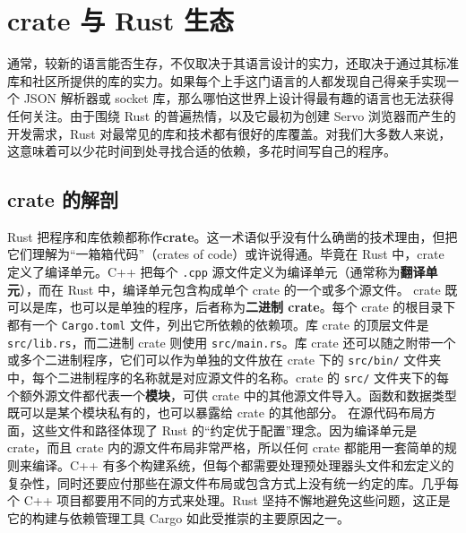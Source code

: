 \section{crate 与 Rust 生态}
\label{idx:idx_a44cb325}
通常，较新的语言能否生存，不仅取决于其语言设计的实力，还取决于通过其标准库和社区所提供的库的实力。如果每个上手这门语言的人都发现自己得亲手实现一个 JSON 解析器或 socket 库，那么哪怕这世界上设计得最有趣的语言也无法获得任何关注。由于围绕 Rust 的普遍热情，以及它最初为创建 Servo 浏览器而产生的开发需求，Rust 对最常见的库和技术都有很好的库覆盖。对我们大多数人来说，这意味着可以少花时间到处寻找合适的依赖，多花时间写自己的程序。
\subsection{crate 的解剖}
\label{idx:idx_aeacb72d}
\label{idx:idx_a3f4f844}
\label{idx:idx_6732412a}
Rust 把程序和库依赖都称作\textbf{crate}。这一术语似乎没有什么确凿的技术理由，但把它们理解为“一箱箱代码”（crates of code）或许说得通。毕竟在 Rust 中，crate 定义了编译单元。C++ 把每个 \texttt{.cpp} 源文件定义为编译单元（通常称为\textbf{翻译单元}），而在 Rust 中，编译单元包含构成单个 crate 的一个或多个源文件。
\label{idx:idx_5f04d853}
crate 既可以是库，也可以是单独的程序，后者称为\textbf{二进制 crate}。每个 crate 的根目录下都有一个 \texttt{Cargo.toml} 文件，列出它所依赖的依赖项。库 crate 的顶层文件是 \texttt{src/lib.rs}，而二进制 crate 则使用 \texttt{src/main.rs}。库 crate 还可以随之附带一个或多个二进制程序，它们可以作为单独的文件放在 crate 下的 \texttt{src/bin/} 文件夹中，每个二进制程序的名称就是对应源文件的名称。crate 的 \texttt{src/} 文件夹下的每个额外源文件都代表一个\textbf{模块}，可供 crate 中的其他源文件导入。函数和数据类型既可以是某个模块私有的，也可以暴露给 crate 的其他部分。
\label{idx:idx_b0294c9f}
在源代码布局方面，这些文件和路径体现了 Rust 的“约定优于配置”理念。因为编译单元是 crate，而且 crate 内的源文件布局非常严格，所以任何 crate 都能用一套简单的规则来编译。C++ 有多个构建系统，但每个都需要处理预处理器头文件和宏定义的复杂性，同时还要应付那些在源文件布局或包含方式上没有统一约定的库。几乎每个 C++ 项目都要用不同的方式来处理。Rust 坚持不懈地避免这些问题，这正是它的构建与依赖管理工具 Cargo 如此受推崇的主要原因之一。
